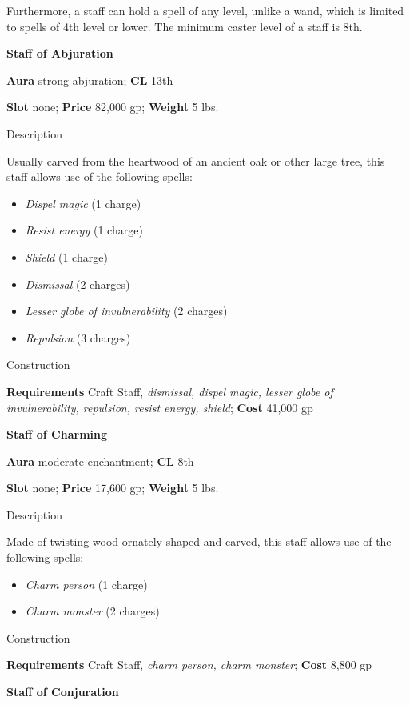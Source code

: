 Furthermore, a staff can hold a spell of any level, unlike a wand, which is limited to spells of 4th level or lower. The minimum caster level of a staff is 8th.
				
\textbf{Staff of Abjuration}
				
\textbf{Aura} strong abjuration; \textbf{CL} 13th
				
\textbf{Slot} none; \textbf{Price} 82,000 gp; \textbf{Weight} 5 lbs.
				
Description
				
Usually carved from the heartwood of an ancient oak or other large tree, this staff allows use of the following spells:
				\begin{itemize}\item  \textit{Dispel magic} (1 charge)
				\item  \textit{Resist energy} (1 charge)
				\item  \textit{Shield} (1 charge)
				\item  \textit{Dismissal} (2 charges)
				\item  \textit{Lesser globe of invulnerability} (2 charges)
				\item  \textit{Repulsion} (3 charges) 
\end{itemize}
				
Construction
				
\textbf{Requirements} Craft Staff, \textit{dismissal, dispel magic, lesser globe of invulnerability, repulsion, resist energy, shield}; \textbf{Cost }41,000 gp
				
\textbf{Staff of Charming}
				
\textbf{Aura} moderate enchantment;\textbf{ CL }8th
				
\textbf{Slot} none; \textbf{Price} 17,600 gp; \textbf{Weight} 5 lbs.
				
Description
				
Made of twisting wood ornately shaped and carved, this staff allows use of the following spells:
				\begin{itemize}\item  \textit{Charm person} (1 charge)
				\item  \textit{Charm monster} (2 charges) 
\end{itemize}
				
Construction
				
\textbf{Requirements} Craft Staff, \textit{charm person, charm monster}; \textbf{Cost }8,800 gp
				
\textbf{Staff of Conjuration}
				
